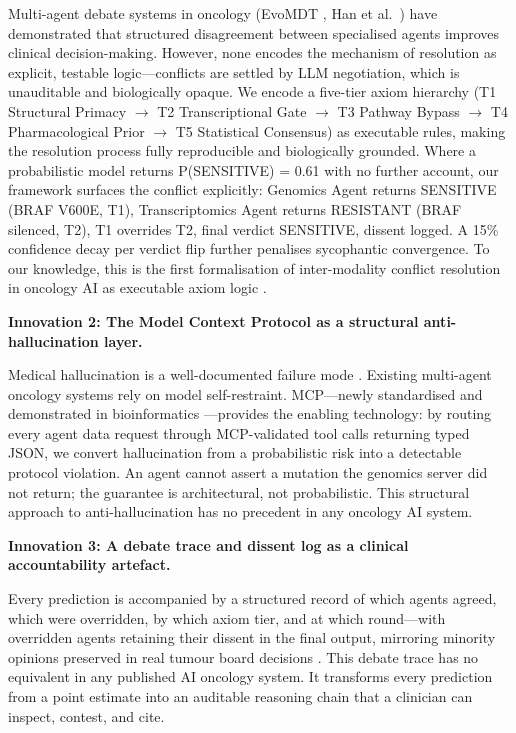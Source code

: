 \documentclass[11pt,letterpaper]{article}
\begin{document}
Multi-agent debate systems in oncology (EvoMDT \cite{ref11}, Han et al.\ \cite{ref12}) have
demonstrated that structured disagreement between specialised agents improves clinical
decision-making. However, none encodes the mechanism of resolution as explicit, testable
logic---conflicts are settled by LLM negotiation, which is unauditable and biologically opaque.
We encode a five-tier axiom hierarchy (T1 Structural Primacy $\to$ T2 Transcriptional Gate
$\to$ T3 Pathway Bypass $\to$ T4 Pharmacological Prior $\to$ T5 Statistical Consensus) as
executable rules, making the resolution process fully reproducible and biologically grounded.
Where a probabilistic model returns P(SENSITIVE) = 0.61 with no further account, our
framework surfaces the conflict explicitly: Genomics Agent returns SENSITIVE (BRAF V600E,
T1), Transcriptomics Agent returns RESISTANT (BRAF silenced, T2), T1 overrides T2, final
verdict SENSITIVE, dissent logged. A 15\% confidence decay per verdict flip further penalises
sycophantic convergence. To our knowledge, this is the first formalisation of inter-modality
conflict resolution in oncology AI as executable axiom logic \cite{ref21}.

\textbf{Innovation 2: The Model Context Protocol as a structural anti-hallucination layer.}

Medical hallucination is a well-documented failure mode \cite{ref13,ref14}. Existing
multi-agent oncology systems rely on model self-restraint. MCP---newly standardised and
demonstrated in bioinformatics \cite{ref15,ref16}---provides the enabling technology: by routing
every agent data request through MCP-validated tool calls returning typed JSON, we convert
hallucination from a probabilistic risk into a detectable protocol violation. An agent cannot assert
a mutation the genomics server did not return; the guarantee is architectural, not probabilistic.
This structural approach to anti-hallucination has no precedent in any oncology AI system.

\textbf{Innovation 3: A debate trace and dissent log as a clinical accountability artefact.}

Every prediction is accompanied by a structured record of which agents agreed, which were
overridden, by which axiom tier, and at which round---with overridden agents retaining their
dissent in the final output, mirroring minority opinions preserved in real tumour board decisions
\cite{ref12,ref18}. This debate trace has no equivalent in any published AI oncology system. It
transforms every prediction from a point estimate into an auditable reasoning chain that a
clinician can inspect, contest, and cite.
\end{document}
